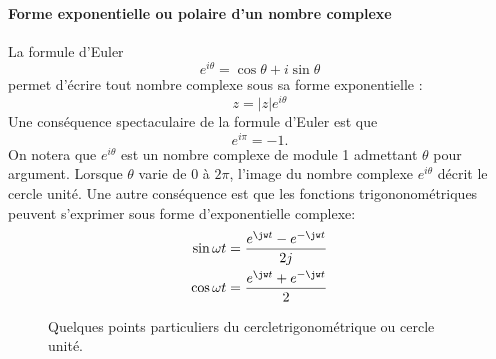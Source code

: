 \paragraph{Forme exponentielle ou polaire d'un nombre complexe}
La formule d'Euler 
\[
e^{i\theta}=\cos\theta+i\sin\theta
\]
permet d'écrire tout nombre complexe sous sa forme exponentielle : 
\[
z=|z|e^{i\theta}
\]
Une conséquence spectaculaire de la formule d'Euler est que
\[
e^{i\pi}=-1.
\]
On notera que $e^{i\theta}$ est un nombre complexe de module 1 admettant 
$\theta$ pour argument. Lorsque $\theta$ varie de $0$ à $2\pi$, l'image du 
nombre complexe $e^{i\theta}$ décrit le cercle unité.
Une autre conséquence est que les fonctions trigononométriques peuvent 
s'exprimer sous forme d'exponentielle complexe:
\begin{align*}
    \sin{\omega t}&=\dfrac{e^{\jw t}-e^{-\jw t}}{2j} \\
    \cos{\omega t}&=\dfrac{e^{\jw t}+e^{-\jw t}}{2}
\end{align*}
\begin{figure}[!ht]
    \centering
    
    \caption{Quelques points particuliers du cercletrigonométrique 
    ou cercle unité.}
\end{figure}
